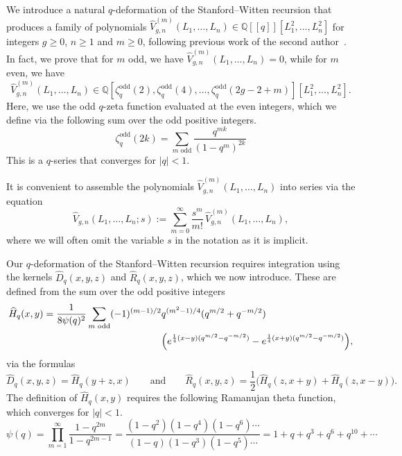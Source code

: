 \documentclass[a4paper]{article}
\theoremstyle{plain}
\theoremstyle{definition}
\renewcommand{\geq}{\geqslant}
\newcommand{\bq}{\mathbb{Q}}
\begin{document}
We introduce a natural $q$-deformation of the Stanford--Witten recursion that produces a family of polynomials $\widehat{V}_{g,n}^{(m)}(L_1, \ldots, L_n) \in\bq[[q]][L_1^2, \ldots, L_n^2]$ for integers $g \geq 0$, $n \geq 1$ and $m \geq 0$, following previous work of the second author~\cite{NorSup}. In fact, we prove that for $m$ odd, we have $\widehat{V}_{g,n}^{(m)}(L_1, \ldots, L_n) = 0$, while for $m$ even, we have
\[
\widehat{V}_{g,n}^{(m)}(L_1, \ldots, L_n) \in \bq[\zeta^{\mathrm{odd}}_q(2), \zeta^{\mathrm{odd}}_q(4), \ldots, \zeta^{\mathrm{odd}}_q(2g-2+m)] [L_1^2, \ldots, L_n^2].
\]
Here, we use the odd $q$-zeta function evaluated at the even integers, which we define via the following sum over the odd positive integers.
\[
\zeta^{\mathrm{odd}}_q(2k)=\sum_{m \text{ odd}} \frac{q^{mk}}{(1-q^m)^{2k}}
\]
This is a $q$-series that converges for $|q|<1$.

It is convenient to assemble the polynomials $\widehat{V}_{g,n}^{(m)}(L_1, \ldots, L_n)$ into series via the equation
\begin{equation} \label{supvolpol}
\widehat{V}_{g,n}(L_1, \ldots, L_n; s) := \sum_{m=0}^\infty \frac{s^m}{m!} \, \widehat{V}_{g,n}^{(m)}(L_1, \ldots, L_n),
\end{equation}
where we will often omit the variable $s$ in the notation as it is implicit. 


Our $q$-deformation of the Stanford--Witten recursion requires integration using the kernels $\widehat{D}_q(x,y,z)$ and $\widehat{R}_q(x,y,z)$, which we now introduce. These are defined from the sum over the odd positive integers
\begin{align}
\widehat{H}_q(x,y) = \frac{1}{8\psi(q)^{2}} \sum_{m \text{ odd}} (-1)^{(m-1)/2} &q^{(m^2-1)/4}(q^{m/2}+q^{-m/2}) \notag \\
&\Big( e^{\frac{1}{4}(x-y)(q^{m/2}-q^{-m/2})}-e^{\frac{1}{4}(x+y)(q^{m/2}-q^{-m/2})} \Big), \label{Hqsup}
\end{align}
via the formulas
\[
\widehat{D}_q(x,y,z)=\widehat{H}_q(y+z,x) \qquad \text{and} \qquad \widehat{R}_q(x,y,z) = \frac{1}{2} \big(\widehat{H}_q(z,x+y)+\widehat{H}_q(z,x-y) \big).
\]
The definition of $\widehat{H}_q(x,y)$ requires the following Ramanujan theta function, which converges for $|q|<1$.
\[
\psi(q) = \prod_{m=1}^\infty\frac{1-q^{2m}}{1-q^{2m-1}}=\frac{(1-q^2)(1-q^4)(1-q^6) \cdots}{(1-q)(1-q^3)(1-q^5) \cdots} = 1+q+q^3+q^6+q^{10} + \cdots
\]
\end{document}
